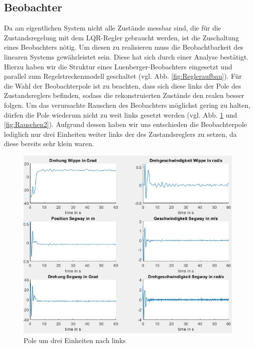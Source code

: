 \documentclass[pdf]{ifacconf}
\begin{document}
	\subsection{Beobachter}
		Da am eigentlichen System nicht alle Zustände messbar sind, die für die Zustandsregelung 			mit dem LQR-Regler gebraucht werden, ist die Zuschaltung eines Beobachters nötig.
	Um diesen zu realisieren muss die Beobachtbarkeit des linearen Systems gewährleistet sein.
	Diese hat sich durch einer Analyse bestätigt.
	Hierzu haben wir die Struktur eines Luenberger-Beobachters eingesetzt und parallel zum            	Regelstreckenmodell geschaltet (vgl. Abb. \ref{fig:Regleraufbau}). Für die Wahl der Beobachterpole ist zu beachten, dass sich diese links der Pole des Zustandsreglers befinden, sodass die rekonstruierten Zustände den realen besser folgen. Um das verursachte Rauschen des Beobachters möglichst gering zu halten, dürfen die Pole wiederum nicht zu weit links gesetzt werden (vgl. Abb. \ref{fig:Rauschen1} und \ref{fig:Rauschen2}). Aufgrund dessen haben wir uns entschieden die Beobachterpole lediglich nur drei Einheiten weiter links der des Zustandsreglers zu setzen, da diese bereits sehr klein waren. 
	
	
	\begin{figure}[h]	
\centerline{\includegraphics[width=\linewidth]{Bilder/Regler1.jpg}}
	\caption{Pole um drei Einheiten nach links}	\label{fig:Rauschen1}
\end{figure}
\end{document}
